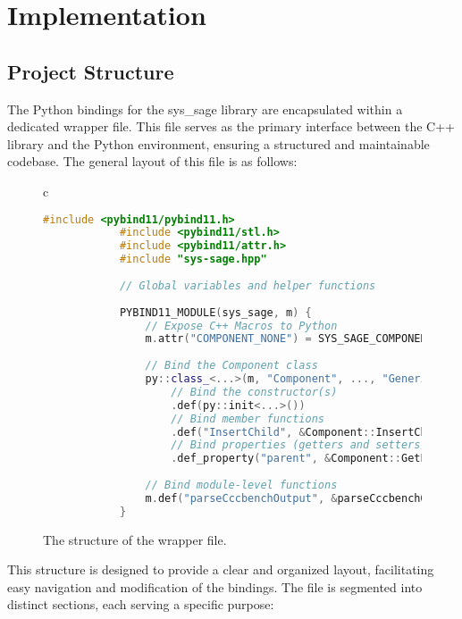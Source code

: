 \chapter{Implementation}\label{chapter:Implementation}

\section{Project Structure}

The Python bindings for the sys\_sage library are encapsulated within a dedicated wrapper file. This file serves as the primary interface between the C++ library and the Python environment, ensuring a structured and maintainable codebase. The general layout of this file is as follows:
\begin{figure}[htpb]
    \centering
    \begin{tabular}{c}
        \begin{lstlisting}[language=C++]
            #include <pybind11/pybind11.h>
            #include <pybind11/stl.h>
            #include <pybind11/attr.h>
            #include "sys-sage.hpp"
            
            // Global variables and helper functions
            
            PYBIND11_MODULE(sys_sage, m) {
                // Expose C++ Macros to Python
                m.attr("COMPONENT_NONE") = SYS_SAGE_COMPONENT_NONE;
            
                // Bind the Component class
                py::class_<...>(m, "Component", ..., "Generic Component")
                    // Bind the constructor(s)
                    .def(py::init<...>())
                    // Bind member functions
                    .def("InsertChild", &Component::InsertChild, ...)
                    // Bind properties (getters and setters)
                    .def_property("parent", &Component::GetParent, &Component::SetParent, ...);
            
                // Bind module-level functions
                m.def("parseCccbenchOutput", &parseCccbenchOutput, ...);
            }
            \end{lstlisting}
    \end{tabular}
    \caption[Structure of the wrapper file]{The structure of the wrapper file.}\label{fig:wrapper-structure}
  \end{figure}


This structure is designed to provide a clear and organized layout, facilitating easy navigation and modification of the bindings. The file is segmented into distinct sections, each serving a specific purpose:

